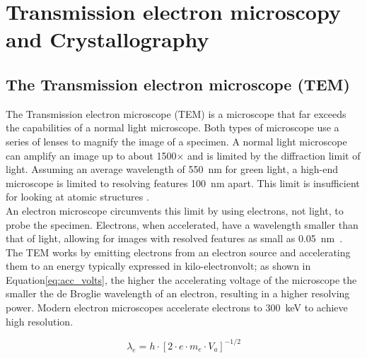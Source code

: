 \chapter{Transmission electron microscopy and Crystallography}
\label{sec:theory}

\section{The Transmission electron microscope (TEM)}
The Transmission electron microscope (TEM) is a microscope that far exceeds the capabilities of a normal light microscope. Both types of microscope use a series of lenses to magnify the image of a specimen.
A normal light microscope can amplify an image up to about 1500$\times$ and is limited by the diffraction limit of light. Assuming an average wavelength of \SI{550}{\nm} for green light, a high-end microscope is limited to resolving features \SI{100}{\nm} apart. This limit is insufficient for looking at atomic structures \cite{PhysRevLett.106.193905}.\\
An electron microscope circumvents this limit by using electrons, not light, to probe the specimen. Electrons, when accelerated, have a wavelength smaller than that of light, allowing for images with resolved features as small as \SI{0.05}{\nm}~\cite{kisielowski_freitag_bischoff_van}. 
The TEM works by emitting electrons from an electron source and accelerating them to an energy typically expressed in kilo-electronvolt; as shown in Equation\ref{eq:acc_volts}, the higher the accelerating voltage of the microscope the smaller the de Broglie wavelength of an electron, resulting in a higher resolving power. Modern electron microscopes accelerate electrons to \SI{300}{\kilo \electronvolt} to achieve high resolution.

\begin{equation}
    \lambda_e = h\cdot \left[ 2 \cdot e \cdot m_e \cdot V_a \right]^{-1/2}
    \label{eq:acc_volts}
\end{equation}


